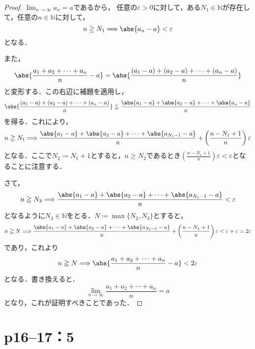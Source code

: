 \begin{tleftbar}
    \begin{proof}
        $\lim_{n \to \infty} a_n =a$であるから，
        任意の$\varepsilon >0$に対して，ある$N_1 \in \mathbb{N}$が存在して，任意の$n \in \mathbb{N}$に対して，
        \[
            n \ge N_1 \Longrightarrow \abs{a_n -a}<\varepsilon
        \]
        となる．

        また，
        \[
            \abs{\frac{a_1+a_2+\cdots+a_n}{n}-a}= \abs{\frac{(a_1-a)+(a_2-a)+\cdots+(a_n-a)}{n}}
        \]
        と変形する．この右辺に補題を適用し，
        \[
            \abs{\frac{(a_1-a)+(a_2-a)+\cdots+(a_n-a)}{n}} \leqq \frac{\abs{a_1-a}+\abs{a_2-a}+\cdots+\abs{a_n-a}}{n}
        \]
        を得る．これにより，
        \[
            n \ge N_1 \Longrightarrow \frac{\abs{a_1-a}+\abs{a_2-a}+\cdots+\abs{a_{N_1-1}-a}}{n} +\left( \frac{n-N_1+1}{n} \right ) \varepsilon
        \]
        となる．ここで$N_2 \coloneqq N_1 +1$とすると，$n \ge N_2$であるとき$\left( \frac{n-N_1+1}{n} \right ) \varepsilon < \varepsilon$となることに注意する．

        さて，
        \[
            n \ge N_3 \Longrightarrow \frac{\abs{a_1-a}+\abs{a_2-a}+\cdots+\abs{a_{N_1-1}-a}}{n}<\varepsilon
        \]
        となるように$N_3 \in \mathbb{N}$をとる．$N \coloneqq \max \{ N_2 , N_3 \}$とすると，
        \[
            n \ge N \Longrightarrow \frac{\abs{a_1-a}+\abs{a_2-a}+\cdots+\abs{a_{N_1-1}-a}}{n} +\left( \frac{n-N_1+1}{n} \right ) \varepsilon < \varepsilon + \varepsilon = 2 \varepsilon
        \]
        であり，これより
        \[
            n \ge N \Longrightarrow \abs{\frac{a_1+a_2+\cdots+a_n}{n}-a} < 2 \varepsilon
        \]
        となる．書き換えると．
        \[
            \lim_{n \to \infty} \frac{a_1+a_2+\cdots+a_n}{n}=a
        \]
        となり，これが証明すべきことであった．
    \end{proof}
\end{tleftbar}

\newpage

\section*{p16--17：5}

